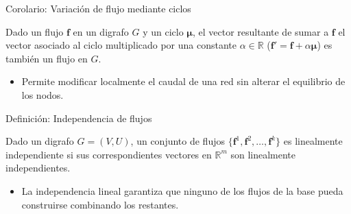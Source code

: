 \documentclass[
  ignorenonframetext,
]{beamer}
\providecommand{\tightlist}{%
  \setlength{\itemsep}{0pt}\setlength{\parskip}{0pt}}
\begin{document}
\begin{frame}{Corolario: Variación de flujo mediante ciclos}
\label{corolario-variaciuxf3n-de-flujo-mediante-ciclos}
\begin{tcolorbox}[enhanced jigsaw, opacityback=0, breakable, title=\textcolor{quarto-callout-note-color}{\faInfo}\hspace{0.5em}{Variación de flujo mediante ciclos}, colback=white, colbacktitle=quarto-callout-note-color!10!white, bottomrule=.15mm, opacitybacktitle=0.6, coltitle=black, bottomtitle=1mm, leftrule=.75mm, colframe=quarto-callout-note-color-frame, toptitle=1mm, titlerule=0mm, rightrule=.15mm, left=2mm, arc=.35mm, toprule=.15mm]

Dado un flujo \(\mathbf{f}\) en un digrafo \(G\) y un ciclo
\(\mathbf{\mu}\), el vector resultante de sumar a \(\mathbf{f}\) el
vector asociado al ciclo multiplicado por una constante
\(\alpha \in \mathbb{R}\)
(\(\mathbf{f}' = \mathbf{f} + \alpha \mathbf{\mu}\)) es también un flujo
en \(G\).

\end{tcolorbox}

\begin{itemize}
\tightlist
\item
  Permite modificar localmente el caudal de una red sin alterar el
  equilibrio de los nodos.
\end{itemize}
\end{frame}

\begin{frame}{Definición: Independencia de flujos}
\label{definiciuxf3n-independencia-de-flujos}
\begin{tcolorbox}[enhanced jigsaw, opacityback=0, breakable, title=\textcolor{quarto-callout-note-color}{\faInfo}\hspace{0.5em}{Independencia de flujos}, colback=white, colbacktitle=quarto-callout-note-color!10!white, bottomrule=.15mm, opacitybacktitle=0.6, coltitle=black, bottomtitle=1mm, leftrule=.75mm, colframe=quarto-callout-note-color-frame, toptitle=1mm, titlerule=0mm, rightrule=.15mm, left=2mm, arc=.35mm, toprule=.15mm]

Dado un digrafo \(G = (V, U)\), un conjunto de flujos
\(\{\mathbf{f}^1, \mathbf{f}^2, \dots, \mathbf{f}^k\}\) es linealmente
independiente si sus correspondientes vectores en \(\mathbb{R}^m\) son
linealmente independientes.

\end{tcolorbox}

\begin{itemize}
\tightlist
\item
  La independencia lineal garantiza que ninguno de los flujos de la base
  pueda construirse combinando los restantes.
\end{itemize}
\end{frame}
\end{document}
